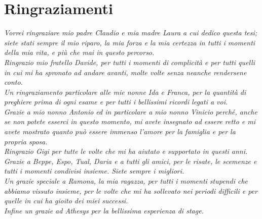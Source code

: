 \documentclass[12pt,a4paper,twoside,openany,english]{book}
\begin{document}

\chapter*{Ringraziamenti}

\textit{Vorrei ringraziare mio padre Claudio e mia madre Laura a cui dedico questa tesi; siete stati sempre il mio riparo, la mia forza e la mia certezza in tutti i momenti della mia vita, e più che mai in questo percorso.\\
Ringrazio mio fratello Davide, per tutti i momenti di complicità e per tutti quelli in cui mi ha spronato ad andare avanti, molte volte senza neanche rendersene conto.\\
Un ringraziamento particolare alle mie nonne Ida e Franca, per la quantità di preghiere prima di ogni esame e per tutti i bellissimi ricordi legati a voi.\\
Grazie a mio nonno Antonio ed in particolare a mio nonno Vinicio perché, anche se non potete esserci in questo momento, mi avete insegnato ad essere retto e mi avete mostrato quanto può essere immenso l'amore per la famiglia e per la propria sposa.\\
Ringrazio Gigi per tutte le volte che mi ha aiutato e supportato in questi anni.\\
Grazie a Beppe, Espo, Tual, Daria e a tutti gli amici, per le risate, le scemenze e tutti i momenti condivisi insieme. Siete sempre i migliori.\\
Un grazie speciale a Ramona, la mia ragazza, per tutti i momenti stupendi che abbiamo vissuto insieme, per le volte che mi ha sollevato nei periodi difficili e per quelle in cui ha gioito dei miei successi.\\
Infine un grazie ad Athesys per la bellissima esperienza di stage.}

\cleardoublepage
%
\printglossaries
\nocite{*}
\printbibliography


\end{document}
